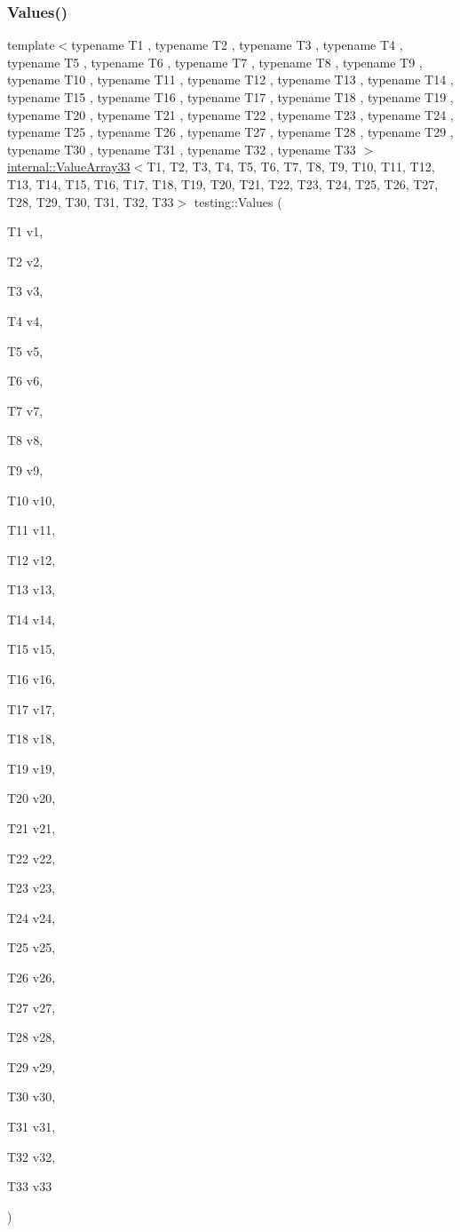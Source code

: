 \subsubsection{\texorpdfstring{Values()}{Values()}\hspace{0.1cm}{\footnotesize\ttfamily [34/51]}}
{\footnotesize\ttfamily template$<$typename T1 , typename T2 , typename T3 , typename T4 , typename T5 , typename T6 , typename T7 , typename T8 , typename T9 , typename T10 , typename T11 , typename T12 , typename T13 , typename T14 , typename T15 , typename T16 , typename T17 , typename T18 , typename T19 , typename T20 , typename T21 , typename T22 , typename T23 , typename T24 , typename T25 , typename T26 , typename T27 , typename T28 , typename T29 , typename T30 , typename T31 , typename T32 , typename T33 $>$ \\
\mbox{\hyperlink{classtesting_1_1internal_1_1_value_array33}{internal\+::\+Value\+Array33}}$<$T1, T2, T3, T4, T5, T6, T7, T8, T9, T10, T11, T12, T13, T14, T15, T16, T17, T18, T19, T20, T21, T22, T23, T24, T25, T26, T27, T28, T29, T30, T31, T32, T33$>$ testing\+::\+Values (\begin{DoxyParamCaption}\item[{T1}]{v1,  }\item[{T2}]{v2,  }\item[{T3}]{v3,  }\item[{T4}]{v4,  }\item[{T5}]{v5,  }\item[{T6}]{v6,  }\item[{T7}]{v7,  }\item[{T8}]{v8,  }\item[{T9}]{v9,  }\item[{T10}]{v10,  }\item[{T11}]{v11,  }\item[{T12}]{v12,  }\item[{T13}]{v13,  }\item[{T14}]{v14,  }\item[{T15}]{v15,  }\item[{T16}]{v16,  }\item[{T17}]{v17,  }\item[{T18}]{v18,  }\item[{T19}]{v19,  }\item[{T20}]{v20,  }\item[{T21}]{v21,  }\item[{T22}]{v22,  }\item[{T23}]{v23,  }\item[{T24}]{v24,  }\item[{T25}]{v25,  }\item[{T26}]{v26,  }\item[{T27}]{v27,  }\item[{T28}]{v28,  }\item[{T29}]{v29,  }\item[{T30}]{v30,  }\item[{T31}]{v31,  }\item[{T32}]{v32,  }\item[{T33}]{v33 }\end{DoxyParamCaption})}

